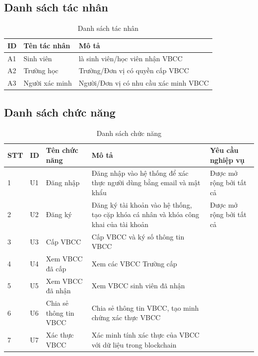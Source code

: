\subsection{Danh sách tác nhân}

\begin{table}[H]
\caption{Danh sách tác nhân}
	\label{table:actor}
	\begin{tabularx} {\textwidth} {|p{1cm}|p{3cm}|X|}
\hline
	ID & Tên tác nhân & Mô tả \\ \hline
	A1 & Sinh viên &  là sinh viên/học viên nhận VBCC \\ \hline
	A2 & Trường học  & Trường/Đơn vị có quyền cấp VBCC \\ \hline
	A3 & Người xác minh  & Người/Đơn vị có nhu cầu xác minh VBCC \\ \hline
\end{tabularx}
\end{table}

\subsection{Danh sách chức năng}

\begin{table}[H]
\caption{Danh sách chức năng}
	\label{table:usecase}
	\begin{tabularx} {\textwidth} {|p{1cm}|p{1cm}|p{3cm}|X|X|}
\hline
		STT &	ID & Tên chức năng & Mô tả & Yêu cầu nghiệp vụ \\ \hline
		1 & U1	& Đăng nhập &Đăng nhập vào hệ thống để xác thực người dùng bằng email và mật khẩu &Được mở rộng bởi tất cả \\ \hline
		2 & U2 & Đăng ký  & Đăng ký tài khoản vào hệ thống, tạo cặp khóa cá nhân và khóa công khai của tài khoản& Được mở rộng bởi tất cả\\ \hline
		3 & U3	&Cấp VBCC & Cấp VBCC và ký số thông tin VBCC & \\ \hline
		4& U4	& Xem VBCC đã cấp&  Xem các VBCC Trường cấp & \\ \hline
		5 & U5	&Xem VBCC đã nhận & Xem VBCC sinh viên đã nhận& \\ \hline
	6	& U6	&Chia sẻ thông tin VBCC &Chia sẻ thông tin VBCC, tạo minh chứng xác thực VBCC & \\ \hline
		7& U7	& Xác thực VBCC &Xác minh tính xác thực của VBCC với dữ liệu trong blockchain& \\ \hline
\end{tabularx}
\end{table}

